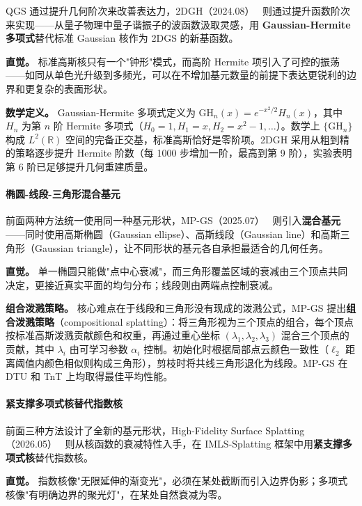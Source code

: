 QGS 通过提升几何阶次来改善表达力，2DGH（2024.08）~\cite{2408_16982} 则通过提升函数阶次来实现——从量子物理中量子谐振子的波函数汲取灵感，用 \textbf{Gaussian-Hermite 多项式}替代标准 Gaussian 核作为 2DGS 的新基函数。

\textbf{直觉。} 标准高斯核只有一个"钟形"模式，而高阶 Hermite 项引入了可控的振荡——如同从单色光升级到多频光，可以在不增加基元数量的前提下表达更锐利的边界和更复杂的表面形状。

\textbf{数学定义。} Gaussian-Hermite 多项式定义为 $\mathrm{GH}_n(x) = e^{-x^2/2} H_n(x)$，其中 $H_n$ 为第 $n$ 阶 Hermite 多项式（$H_0=1, H_1=x, H_2=x^2-1, \ldots$）。数学上 $\{\mathrm{GH}_n\}$ 构成 $L^2(\mathbb{R})$ 空间的完备正交基，标准高斯恰好是零阶项。2DGH 采用从粗到精的策略逐步提升 Hermite 阶数（每 1000 步增加一阶，最高到第 9 阶），实验表明第 6 阶已足够提升几何重建质量。

\paragraph{椭圆-线段-三角形混合基元}

前面两种方法统一使用同一种基元形状，MP-GS（2025.07）~\cite{2507_11321} 则引入\textbf{混合基元}——同时使用高斯椭圆（Gaussian ellipse）、高斯线段（Gaussian line）和高斯三角形（Gaussian triangle），让不同形状的基元各自承担最适合的几何任务。

\textbf{直觉。} 单一椭圆只能做"点中心衰减"，而三角形覆盖区域的衰减由三个顶点共同决定，更接近真实平面的均匀分布；线段则由两端点控制衰减。

\textbf{组合泼溅策略。} 核心难点在于线段和三角形没有现成的泼溅公式，MP-GS 提出\textbf{组合泼溅策略}（compositional splatting）：将三角形视为三个顶点的组合，每个顶点按标准高斯泼溅贡献颜色和权重，再通过重心坐标 $(\lambda_1, \lambda_2, \lambda_3)$ 混合三个顶点的贡献，其中 $\lambda_i$ 由可学习参数 $\alpha_i$ 控制。初始化时根据局部点云颜色一致性（$\ell_2$ 距离阈值内颜色相似则构成三角形），剪枝时将共线三角形退化为线段。MP-GS 在 DTU 和 TnT 上均取得最佳平均性能。

\paragraph{紧支撑多项式核替代指数核}

前面三种方法设计了全新的基元形状，High-Fidelity Surface Splatting（2026.05）~\cite{2605_07254} 则从核函数的衰减特性入手，在 IMLS-Splatting 框架中用\textbf{紧支撑多项式核}替代指数核。

\textbf{直觉。} 指数核像"无限延伸的渐变光"，必须在某处截断而引入边界伪影；多项式核像"有明确边界的聚光灯"，在某处自然衰减为零。

